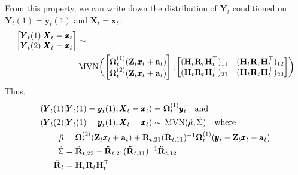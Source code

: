 \documentclass[]{article}
\def\OMG{\mbox{\boldmath $\Omega$}}
\def\ZZ{\mbox{$\mathbf Z$}}	\def\zz{\mbox{$\mathbf z$}}
\def\HH{\mbox{$\mathbf H$}}	\def\hh{\mbox{$\mathbf h$}}
\def\RR{\mbox{$\mathbf R$}}	 \def\rr{\mbox{$\mathbf r$}}
\def\XX{\mbox{$\pmb{X}$}}	\def\xx{\mbox{$\pmb{x}$}}
\def\YY{\mbox{$\pmb{Y}$}}	\def\yy{\mbox{$\pmb{y}$}}
\def\MVN{\,\textup{\textrm{MVN}}}
\begin{document}
From this property, we can write down the distribution of $\YY_t$ conditioned on $\YY_t(1)=\yy_t(1)$ and $\XX_t=\xx_t$:
\begin{equation}
\begin{split}
\begin{bmatrix}
\YY_t(1)|\XX_t=\xx_t\\
\YY_t(2)|\XX_t=\xx_t
\end{bmatrix}
&\sim \\
&\MVN\biggl( \begin{bmatrix}
\OMG_t^{(1)}(\ZZ_t\xx_t+\aa_t)\\
\OMG_t^{(2)}(\ZZ_t\xx_t+\aa_t)
\end{bmatrix}, \begin{bmatrix}
(\HH_t\RR_t\HH_t^\top)_{11}&(\HH_t\RR_t\HH_t^\top)_{12}\\
(\HH_t\RR_t\HH_t^\top)_{21}&(\HH_t\RR_t\HH_t^\top)_{22}
\end{bmatrix}\biggr)
\end{split}
\end{equation}
Thus, 
\begin{equation}\label{eq:varY}
\begin{split}
(\YY_t(1)&|\YY_t(1)=\yy_t(1),\XX_t=\xx_t) = \OMG_t^{(1)}\yy_t\quad\text{and}\\
(\YY_t(2)&|\YY_t(1)=\yy_t(1),\XX_t=\xx_t) \sim \MVN(\ddot{\mu},\ddot{\Sigma})\quad\text{where}\\
\ddot{\mu}&= \OMG_t^{(2)}(\ZZ_t\xx_t+\aa_t)+\ddot{\RR}_{t,21}(\ddot{\RR}_{t,11})^{-1}\OMG_t^{(1)}(\yy_t-\ZZ_t\xx_t-\aa_t)\\
\ddot{\Sigma}&= \ddot{\RR}_{t,22} - \ddot{\RR}_{t,21}(\ddot{\RR}_{t,11})^{-1}\ddot{\RR}_{t,12} \\
\ddot{\RR}_t&= \HH_t\RR_t\HH_t^\top 
\end{split}
\end{equation}
\end{document}
